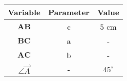\begin{center}
    \begin{tabular}{|c|c|c|} 
        \hline
            \textbf{Variable} & \textbf{Parameter} & \textbf{Value} \\ 
        \hline
            $\boldsymbol{AB}$ & c & 5 cm \\ 
        \hline
            $\boldsymbol{BC}$ & a & - \\ 
        \hline
            $\boldsymbol{AC}$ & b &   -    \\
        \hline
            $\angle \vec{A}$  & -  & $45^\circ$ \\
        \hline
    \end{tabular}
\end{center}  
